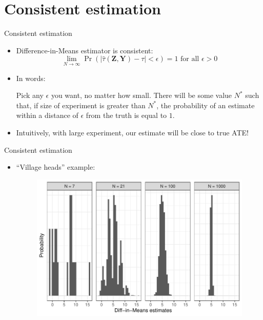 \documentclass[table, xcolor = {dvipsnames}, 9pt]{beamer}
\theoremstyle{plain}
\begin{document}
\section{Consistent estimation}
\begin{frame}{Consistent estimation}
\vfill
\begin{itemize} \vfill
\item Difference-in-Means estimator is consistent: \pause \vfill
\begin{equation*}
\lim \limits_{N \to \infty} \Pr\left(\left\lvert \hat{\tau}\left(\bm{Z}, \bm{Y}\right) - \tau \right\rvert < \epsilon \right) = 1 \text{ for all } \epsilon > 0
\end{equation*} \pause \vfill
\item In words: \vfill
\begin{center}
Pick any $\epsilon$ you want, no matter how small. There will be some value $N^{*}$ such that, if size of experiment is greater than $N^*$, 
the probability of an estimate within a distance of $\epsilon$ from the truth is equal to $1$.
\end{center} \pause \vfill
\item Intuitively, with large experiment, our estimate will be close to true ATE! \vfill
\end{itemize}
\vfill
\end{frame}
\begin{frame}{Consistent estimation}
\vfill
\begin{itemize} \vfill
\item ``Village heads'' example: \vfill
\begin{figure}[H]
\includegraphics[width=\linewidth]{asymp_ests_plot.pdf}
\end{figure}
\end{itemize}
\vfill
\end{frame}
\end{document}

